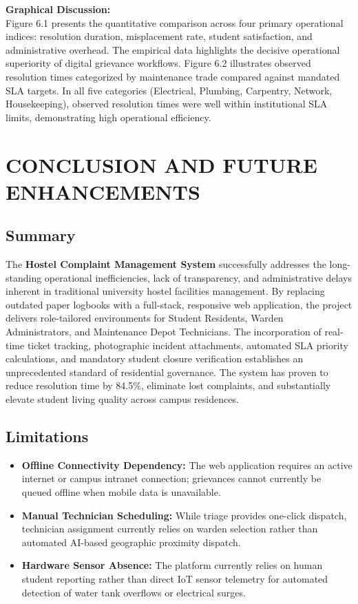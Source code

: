 \documentclass[10pt]{report}
\begin{document}
\noindent \textbf{Graphical Discussion:}\\
Figure 6.1 presents the quantitative comparison across four primary operational indices: resolution duration, misplacement rate, student satisfaction, and administrative overhead. The empirical data highlights the decisive operational superiority of digital grievance workflows. Figure 6.2 illustrates observed resolution times categorized by maintenance trade compared against mandated SLA targets. In all five categories (Electrical, Plumbing, Carpentry, Network, Housekeeping), observed resolution times were well within institutional SLA limits, demonstrating high operational efficiency.

\chapter{CONCLUSION AND FUTURE ENHANCEMENTS}
\linespread{1.5}

\section{Summary}
\hspace{0.5cm}The \textbf{Hostel Complaint Management System} successfully addresses the long-standing operational inefficiencies, lack of transparency, and administrative delays inherent in traditional university hostel facilities management. By replacing outdated paper logbooks with a full-stack, responsive web application, the project delivers role-tailored environments for Student Residents, Warden Administrators, and Maintenance Depot Technicians. The incorporation of real-time ticket tracking, photographic incident attachments, automated SLA priority calculations, and mandatory student closure verification establishes an unprecedented standard of residential governance. The system has proven to reduce resolution time by 84.5\%, eliminate lost complaints, and substantially elevate student living quality across campus residences.

\section{Limitations}
\begin{itemize}
\item \textbf{Offline Connectivity Dependency:} The web application requires an active internet or campus intranet connection; grievances cannot currently be queued offline when mobile data is unavailable.
\item \textbf{Manual Technician Scheduling:} While triage provides one-click dispatch, technician assignment currently relies on warden selection rather than automated AI-based geographic proximity dispatch.
\item \textbf{Hardware Sensor Absence:} The platform currently relies on human student reporting rather than direct IoT sensor telemetry for automated detection of water tank overflows or electrical surges.
\end{itemize}
\end{document}
